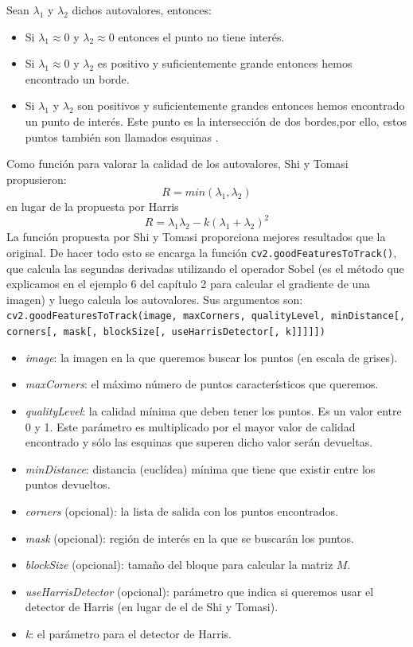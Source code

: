 \documentclass[a4paper,openright, 12pt]{book}
\begin{document}
Sean $\lambda_1$ y $\lambda_2$ dichos autovalores, entonces:
\begin{itemize}
\item Si  $ \lambda_1 \approx 0 $ y $\lambda_2 \approx 0 $ entonces el punto no tiene interés.
\item Si  $ \lambda_1 \approx 0 $ y $\lambda_2 $ es positivo y suficientemente grande entonces hemos encontrado un borde.
\item Si  $ \lambda_1 $ y $\lambda_2 $ son positivos y suficientemente grandes entonces hemos encontrado un punto de interés. Este punto es la intersección de dos bordes,por ello, estos puntos también son llamados esquinas .
\end{itemize}
Como función para valorar la calidad de los autovalores, Shi y Tomasi \cite{shiandtomasi} propusieron:
\begin{equation*}
R = min(\lambda_1, \lambda_2)
\end{equation*}
en lugar de la propuesta por Harris\cite{harris88}
\begin{equation*}
R = \lambda_1 \lambda_2 - k(\lambda_1 + \lambda_2)^2
\end{equation*}
La función propuesta por Shi y Tomasi proporciona mejores resultados que la original.
De hacer todo esto se encarga la función \lstinline|cv2.goodFeaturesToTrack()|, que calcula las segundas derivadas utilizando el operador Sobel (es el método que explicamos en el ejemplo 6 del capítulo 2 para calcular el gradiente de una imagen) y luego calcula los autovalores.
Sus argumentos son:
\newline
\lstinline|cv2.goodFeaturesToTrack(image, maxCorners, qualityLevel, minDistance[, corners[, mask[, blockSize[, useHarrisDetector[, k]]]]]) |
\begin{itemize}
\item \textit{image}: la imagen en la que queremos buscar los puntos (en escala de grises).
\item \textit{maxCorners}:  el máximo número de puntos característicos que queremos.
\item \textit{qualityLevel}: la calidad mínima que deben tener los puntos. Es un valor entre 0 y 1. Este parámetro es multiplicado por el mayor valor de calidad encontrado y sólo las esquinas que superen dicho valor serán devueltas.
\item \textit{minDistance}: distancia (euclídea) mínima que tiene que existir entre los puntos devueltos.
\item \textit{corners} (opcional): la lista de salida con los puntos encontrados.
\item \textit{mask} (opcional): región de interés en la que se buscarán los puntos.
\item \textit{blockSize} (opcional): tamaño del bloque para calcular la matriz $M$.
\item \textit{useHarrisDetector} (opcional): parámetro que indica si queremos usar el detector de Harris (en lugar de el de Shi y Tomasi).
\item \textit{k}: el parámetro para el detector de Harris.
\end{itemize}
\end{document}
